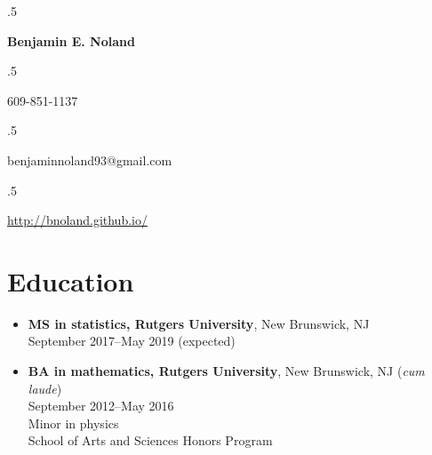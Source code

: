 \documentclass[letterpaper,12pt]{article}
\begin{document}
\moveleft.5\hoffset\centerline{\Large\bf Benjamin E. Noland}
\smallskip
\moveleft.5\hoffset\centerline{609-851-1137}
\moveleft.5\hoffset\centerline{benjaminnoland93@gmail.com}
\moveleft.5\hoffset\centerline{\url{http://bnoland.github.io/}}

\section*{Education}

\begin{itemize}
\item \textbf{MS in statistics, Rutgers University}, New Brunswick, NJ \\
  September 2017--May 2019 (expected)

\item \textbf{BA in mathematics, Rutgers University}, New Brunswick, NJ
  (\textit{cum laude}) \\
  September 2012--May 2016 \\
  Minor in physics \\
  School of Arts and Sciences Honors Program
\end{itemize}

\iffalse
\subsection*{Selection of coursework:}

\begin{itemize}
\item \textbf{Mathematics:} Calculus, linear algebra, ordinary
  differential equations, real analysis, complex variables,
  differential geometry, linear programming, abstract algebra,
  topology \textit{(taken at Rutgers University)}

\item \textbf{Physics:} Classical mechanics, electromagnetism,
  astrophysics \textit{(taken at Rutgers University)}

\item \textbf{Computer science:} Systems programming, data structures
  and algorithms \textit{(taken at Princeton University while in high
    school)}; Advanced Placement computer science \textit{(taken in
    high school)}

\item \textbf{Statistics:} Advanced Placement statistics
  \textit{(taken in high school)}, probability theory, regression
  analysis \textit{(taking at Rutgers University)}

\end{itemize}
\fi
\end{document}
